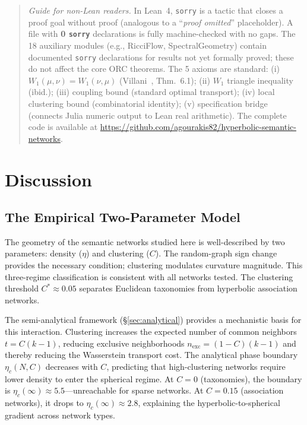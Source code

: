 \documentclass[11pt,a4paper]{article}
\newcommand{\etac}{\eta_c}
\newcommand{\Cstar}{C^*}
\begin{document}
\begin{quote}
\small\textit{Guide for non-Lean readers.} In Lean~4, \texttt{sorry} is a tactic that closes a proof goal without proof (analogous to a ``\textit{proof omitted}'' placeholder). A file with \textbf{0 \texttt{sorry}} declarations is fully machine-checked with no gaps. The 18 auxiliary modules (e.g., RicciFlow, SpectralGeometry) contain documented \texttt{sorry} declarations for results not yet formally proved; these do not affect the core ORC theorems. The 5 axioms are standard: (i) $W_1(\mu,\nu)=W_1(\nu,\mu)$ (Villani~\cite{villani2009optimal}, Thm.\ 6.1); (ii) $W_1$ triangle inequality (ibid.); (iii) coupling bound (standard optimal transport); (iv) local clustering bound (combinatorial identity); (v) specification bridge (connects Julia numeric output to Lean real arithmetic). The complete code is available at \url{https://github.com/agourakis82/hyperbolic-semantic-networks}.
\end{quote}


\section{Discussion}
\label{sec:discussion}

\subsection{The Empirical Two-Parameter Model}

The geometry of the semantic networks studied here is well-described by two parameters: density ($\eta$) and clustering ($C$). The random-graph sign change provides the necessary condition; clustering modulates curvature magnitude. This three-regime classification is consistent with all networks tested. The clustering threshold $\Cstar \approx 0.05$ separates Euclidean taxonomies from hyperbolic association networks.

The semi-analytical framework (\S\ref{sec:analytical}) provides a mechanistic basis for this interaction. Clustering increases the expected number of common neighbors $t = C(k-1)$, reducing exclusive neighborhoods $n_{\mathrm{exc}} = (1-C)(k-1)$ and thereby reducing the Wasserstein transport cost. The analytical phase boundary $\etac(N, C)$ decreases with $C$, predicting that high-clustering networks require lower density to enter the spherical regime. At $C = 0$ (taxonomies), the boundary is $\etac(\infty) \approx 5.5$---unreachable for sparse networks. At $C = 0.15$ (association networks), it drops to $\etac(\infty) \approx 2.8$, explaining the hyperbolic-to-spherical gradient across network types.
\end{document}
